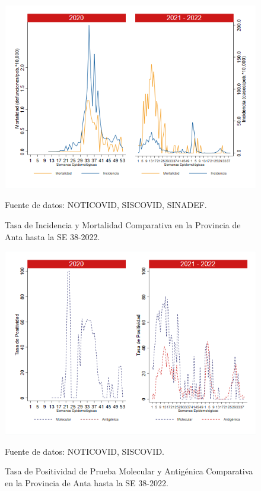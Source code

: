 \documentclass[12pt,a4paper,openany]{book}
\begin{document}
	\begin{figure}[h]
		\caption{Tasa de Incidencia y Mortalidad Comparativa en la Provincia de Anta hasta la SE 38-2022.}\label{fig:inc_mort_anta}
		\begin{center}
			\includegraphics[width=0.85\linewidth]{../figuras/incidencia_mortalidad_20_21_2.png}
		\end{center}
		{\footnotesize {Fuente de datos: NOTICOVID, SISCOVID, SINADEF.}}
	\end{figure}
	
	\begin{figure}[h]
		\caption{Tasa de Positividad de Prueba Molecular y Antigénica Comparativa en la Provincia de Anta hasta la SE 38-2022.}\label{fig:positividad_anta}
		\begin{center}
			\includegraphics[width=0.7\linewidth]{../figuras/positividad_20_21_2.png}
		\end{center}
		{\footnotesize {Fuente de datos: NOTICOVID, SISCOVID.}}
	\end{figure}
	
\end{document}
